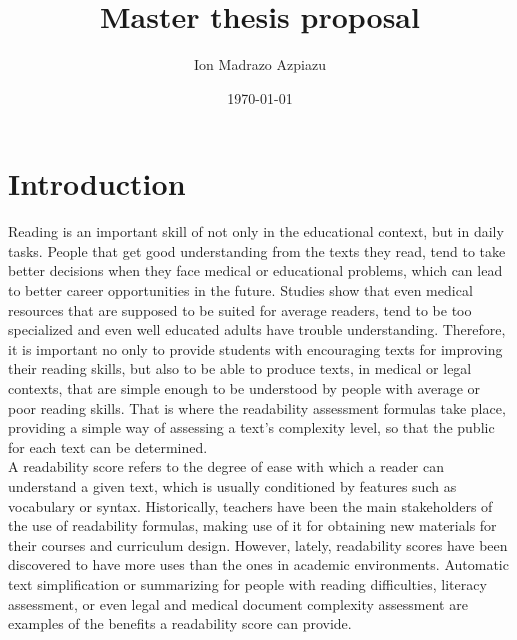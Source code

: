 \documentclass[12pt]{article}
\title{Master thesis proposal}
\author{Ion Madrazo Azpiazu}
\date{\today}
\begin{document}
\maketitle
\section{Introduction}

Reading is an important skill of not only in the educational context, but in daily tasks. People that get good understanding from the texts they read, tend to take better decisions when they face medical or educational problems, which can lead to better career opportunities in the future. Studies\cite{medicalReadability1}\cite{medicalReadability2}\cite{medicalReadability3} show that even medical resources that are supposed to be suited for average readers, tend to be too specialized and even well educated adults have trouble understanding. Therefore, it is important no only to provide students with encouraging texts for improving their reading skills, but also to be able to produce texts, in medical or legal contexts, that are simple enough to be understood by people with average or poor reading skills.  That is where the readability assessment formulas take place, providing a simple way of assessing a text's complexity level, so that the public for each text can be determined. \\


A readability score refers to the degree of ease with which a reader can understand a given text, which is usually conditioned by features such as vocabulary or syntax. Historically, teachers have been the main stakeholders of the use of readability formulas, making use of it for obtaining new materials for their courses and curriculum design. However, lately, readability scores have been discovered to have more uses than the ones in academic environments. Automatic text simplification\cite{textsimplification1}\cite{textsimplification2} or summarizing for people with reading difficulties\cite{textsimplificationWithDisabilities1}, literacy assessment\cite{literacy1}, or even legal\cite{legalreadability} and medical document complexity assessment\cite{medicalReadability1}\cite{medicalReadability2}\cite{medicalReadability3} are examples of the benefits a readability score can provide.\\
\end{document}
